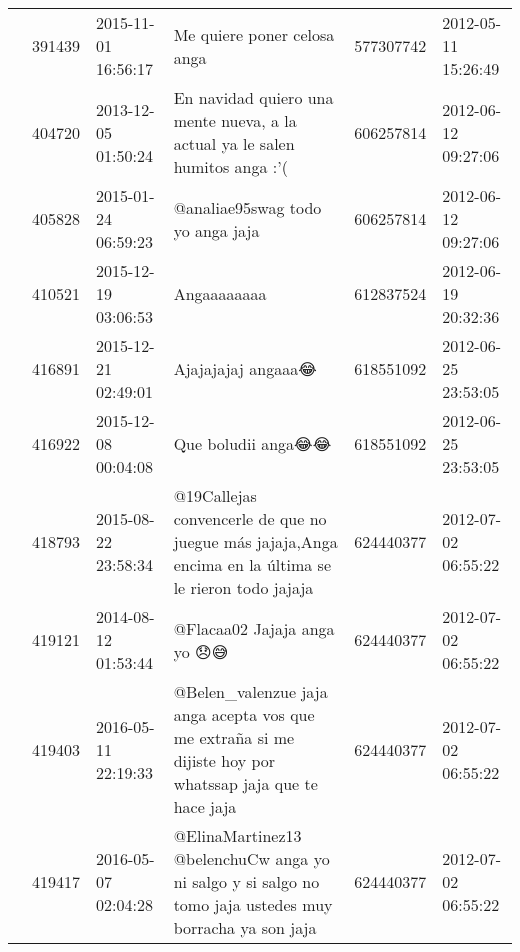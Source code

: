 \begin{tabular}{llllrl}
           & 391439  & 2015-11-01 16:56:17 &                                                                                                                  Me quiere poner celosa anga &   577307742 & 2012-05-11 15:26:49 \\
           & 404720  & 2013-12-05 01:50:24 &                                                                  En navidad quiero una mente nueva, a la actual ya le salen humitos anga :'( &   606257814 & 2012-06-12 09:27:06 \\
           & 405828  & 2015-01-24 06:59:23 &                                                                                                             @analiae95swag todo yo anga jaja &   606257814 & 2012-06-12 09:27:06 \\
           & 410521  & 2015-12-19 03:06:53 &                                                                                                                                  Angaaaaaaaa &   612837524 & 2012-06-19 20:32:36 \\
           & 416891  & 2015-12-21 02:49:01 &                                                                                                                           Ajajajajaj angaaa😂 &   618551092 & 2012-06-25 23:53:05 \\
           & 416922  & 2015-12-08 00:04:08 &                                                                                                                           Que boludii anga😂😂 &   618551092 & 2012-06-25 23:53:05 \\
           & 418793  & 2015-08-22 23:58:34 &                                        @19Callejas convencerle de que no juegue más jajaja,Anga encima en la última se le rieron todo jajaja &   624440377 & 2012-07-02 06:55:22 \\
           & 419121  & 2014-08-12 01:53:44 &                                                                                                                  @Flacaa02 Jajaja anga yo 😞😅 &   624440377 & 2012-07-02 06:55:22 \\
           & 419403  & 2016-05-11 22:19:33 &                                     @Belen\_valenzue jaja anga acepta vos que me extraña si me dijiste hoy por whatssap jaja que te hace jaja &   624440377 & 2012-07-02 06:55:22 \\
           & 419417  & 2016-05-07 02:04:28 &                                       @ElinaMartinez13 @belenchuCw anga yo ni salgo y si salgo no tomo jaja ustedes muy borracha ya son jaja &   624440377 & 2012-07-02 06:55:22 \\

\end{tabular}
